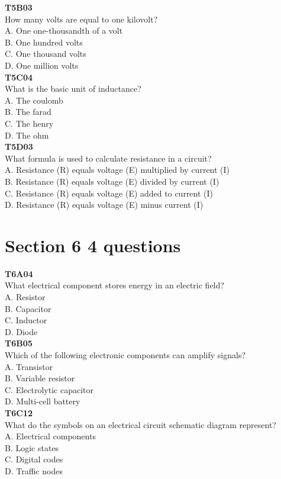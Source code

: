 \documentclass[12pt,letterpaper,twocolumn]{report}
\begin{document}
\textbf{T5B03}\\
How many volts are equal to one kilovolt?\\
A. One one-thousandth of a volt\\
B. One hundred volts\\
C. One thousand volts\\
D. One million volts\\

\textbf{T5C04}\\
What is the basic unit of inductance?\\
A. The coulomb\\
B. The farad\\
C. The henry\\
D. The ohm\\

\textbf{T5D03}\\
What formula is used to calculate resistance in a circuit?\\
A. Resistance (R) equals voltage (E) multiplied by current (I)\\
B. Resistance (R) equals voltage (E) divided by current (I)\\
C. Resistance (R) equals voltage (E) added to current (I)\\
D. Resistance (R) equals voltage (E) minus current (I)\\

\section{Section 6 4 questions}

\textbf{T6A04}\\
What electrical component stores energy in an electric field?\\
A. Resistor\\
B. Capacitor\\
C. Inductor\\
D. Diode\\

\textbf{T6B05}\\
Which of the following electronic components can amplify signals?\\
A. Transistor\\
B. Variable resistor\\
C. Electrolytic capacitor\\
D. Multi-cell battery\\

\textbf{T6C12}\\
What do the symbols on an electrical circuit schematic diagram represent?\\
A. Electrical components\\
B. Logic states\\
C. Digital codes\\
D. Traffic nodes\\
\end{document}
